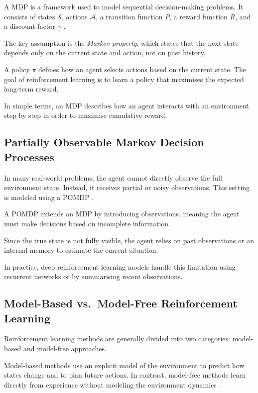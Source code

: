 A \ac{MDP} is a framework used to model sequential decision-making problems. It consists of states $\mathcal{S}$, actions $\mathcal{A}$, a transition function $P$, a reward function $R$, and a discount factor $\gamma$ \cite{sutton_rl_book_2018}.

The key assumption is the \emph{Markov property}, which states that the next state depends only on the current state and action, not on past history.

A policy $\pi$ defines how an agent selects actions based on the current state. The goal of reinforcement learning is to learn a policy that maximises the expected long-term reward.

In simple terms, an \ac{MDP} describes how an agent interacts with an environment step by step in order to maximise cumulative reward.

\subsection{Partially Observable Markov Decision Processes}
\label{sec:bg:pomdp}

In many real-world problems, the agent cannot directly observe the full environment state. Instead, it receives partial or noisy observations. This setting is modeled using a \ac{POMDP} \cite{kaelbling_pomdp_1998}.

A \ac{POMDP} extends an \ac{MDP} by introducing observations, meaning the agent must make decisions based on incomplete information.

Since the true state is not fully visible, the agent relies on past observations or an internal memory to estimate the current situation.

In practice, deep reinforcement learning models handle this limitation using recurrent networks or by summarising recent observations.
\subsection{Model-Based vs.\ Model-Free Reinforcement Learning}

Reinforcement learning methods are generally divided into two categories: model-based and model-free approaches.

Model-based methods use an explicit model of the environment to predict how states change and to plan future actions. In contrast, model-free methods learn directly from experience without modeling the environment dynamics \cite{sutton_rl_book_2018}.

